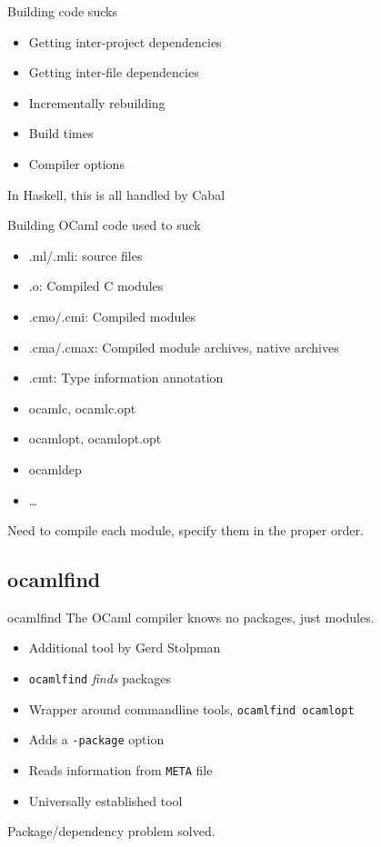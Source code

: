 \documentclass{beamer}
\begin{document}
\begin{frame}{Building code sucks}
  \begin{itemize}
    \item Getting inter-project dependencies
    \item Getting inter-file dependencies
    \item Incrementally rebuilding
    \item Build times
    \item Compiler options
  \end{itemize}
  In Haskell, this is all handled by Cabal
\end{frame}

\begin{frame}{Building OCaml code used to suck}
  \begin{itemize}
    \item .ml/.mli: source files
    \item .o: Compiled C modules
    \item .cmo/.cmi: Compiled modules
    \item .cma/.cmax: Compiled module archives, native archives
    \item .cmt: Type information annotation
  \end{itemize}
  \begin{itemize}
    \item ocamlc, ocamlc.opt
    \item ocamlopt, ocamlopt.opt
    \item ocamldep
    \item …
  \end{itemize}
  Need to compile each module, specify them in the proper order.
\end{frame}

\subsection{ocamlfind}

\begin{frame}{ocamlfind}
  The OCaml compiler knows no packages, just modules.
  \begin{itemize}
    \item Additional tool by Gerd Stolpman
    \item \texttt{ocamlfind} \emph{finds} packages
    \item Wrapper around commandline tools, \texttt{ocamlfind ocamlopt}
    \item Adds a \texttt{-package} option
    \item Reads information from \texttt{META} file
    \item Universally established tool
  \end{itemize}
  Package/dependency problem solved.
\end{frame}
\end{document}
